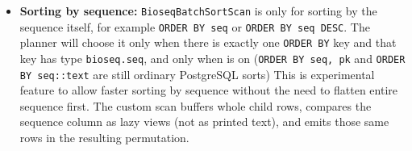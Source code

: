 \begin{itemize}
  \item \textbf{Sorting by sequence:}
    \texttt{BioseqBatchSortScan} is only for sorting by the sequence itself, for example \texttt{ORDER BY seq} or \texttt{ORDER BY seq DESC}.
    The planner will choose it only when there is exactly one \texttt{ORDER BY} key and that key has type \texttt{bioseq.seq}, and only when  is on (\texttt{ORDER BY seq, pk} and \texttt{ORDER BY seq::text} are still ordinary PostgreSQL sorts)
    This is experimental feature to allow faster sorting by sequence without the need to flatten entire sequence first.
    The custom scan buffers whole child rows, compares the sequence column as lazy views (not as printed text), and emits those same rows in the resulting permutation.
\label{lst:bioseqscan-types}
\end{itemize}